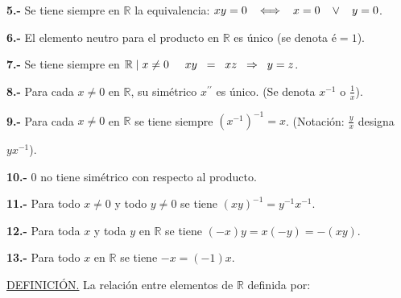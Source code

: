 \documentclass[12pt]{article}
\begin{document}
\textbf{5.-} Se tiene siempre en $\mathbb{R}$ la equivalencia:\hspace{0.3cm} $xy=0 \hspace{0.3cm} \Longleftrightarrow \hspace{0.3cm} x=0 \hspace{0.3cm} \vee \hspace{0.3cm} y=0$.\vspace{0.2cm}


\textbf{6.-}  El elemento neutro para el producto en $\mathbb{R}$ es único (se denota $é=1$).\vspace{0.2cm}


\textbf{7.-}  Se tiene siempre en $\mathbb{R} \mid x \neq 0 \hspace{0.5cm} xy\hspace{0.2cm}=\hspace{0.2cm}xz \hspace{0.2cm} \Rightarrow \hspace{0.2cm} y=z$.\vspace{0.2cm}


\textbf{8.-}  Para cada $x \neq 0 $ en $\mathbb{R}$, su simétrico $x^{{\prime}{\prime}}$ es único. \hspace{0.3cm} (Se denota $x^{-1}$ o $\frac{1}{x}$).\vspace{0.2cm}


\textbf{9.-}  Para cada $x \neq 0$ en $\mathbb{R}$ se tiene siempre $(x^{-1})^{-1}=x$. \hspace{0.1cm} (Notación: $\frac{y}{x}$ designa \par $yx^{-1}$).\vspace{0.2cm}


\textbf{10.-}  0 no tiene simétrico con respecto al producto.\vspace{0.2cm}


\textbf{11.-}  Para todo $x\neq 0$ y todo $y\neq0$ se tiene $(xy)^{-1}=y^{-1}x^{-1}$.\vspace{0.2cm}


\textbf{12.-}  Para toda $x$ y toda $y$ en $\mathbb{R}$ se tiene $(-x)y=x(-y)=-(xy)$.\vspace{0.2cm}


\textbf{13.-}  Para todo $x$ en $\mathbb{R}$ se tiene $-x=(-1)x$. \vspace{0.3cm}

{\underline{DEFINICIÓN.}} La relación entre elementos de $\mathbb{R} $ definida por:\vspace{0.3cm}
\end{document}
